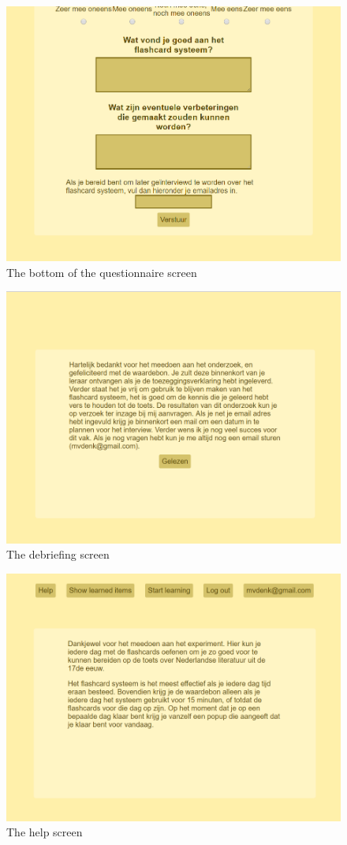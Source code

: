 \begin{figure}
    \centering
    \includegraphics[width=.8\textwidth]{img/ui_questionnaire_bottom.png}
    \caption{The bottom of the questionnaire screen}
    \label{fig:ui_questionnaire_bottom}
\end{figure}

\begin{figure}
    \centering
    \includegraphics[width=.8\textwidth]{img/ui_debriefing.png}
    \caption{The debriefing screen}
    \label{fig:ui_debriefing}
\end{figure}

\begin{figure}
    \centering
    \includegraphics[width=.8\textwidth]{img/ui_help.png}
    \caption{The help screen}
    \label{fig:ui_help}
\end{figure}

